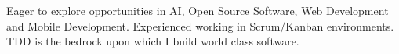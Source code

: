 \vspace{1pc}

\begin{center}
	\noindent Eager to explore opportunities in AI, Open Source Software, Web Development and Mobile Development. Experienced working in Scrum/Kanban environments. TDD is the bedrock upon which I build world class software.
	
\end{center}
\vspace{1pc}